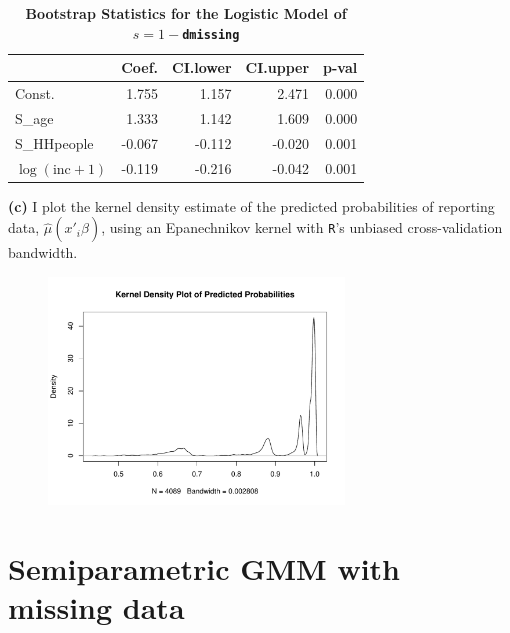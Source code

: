 \documentclass[12pt]{article}
\newcommand{\mtx}[1]{\ensuremath{\bm{\mathit{#1}}}}
\begin{document}
\begin{table}[!htpb]
\centering
\caption{\textbf{Bootstrap Statistics for the Logistic Model of $s=1-$\texttt{dmissing}}}
\begin{tabular}{lrrrr}
  \hline
 & Coef. & CI.lower & CI.upper & p-val \\ 
  \hline
Const. & 1.755 & 1.157 & 2.471 & 0.000 \\ 
  S\_age & 1.333 & 1.142 & 1.609 & 0.000 \\ 
  S\_HHpeople & -0.067 & -0.112 & -0.020 & 0.001 \\ 
  $\log(\text{inc}+1)$  & -0.119 & -0.216 & -0.042 & 0.001 \\ 
   \hline
\end{tabular}
\end{table}

\textbf{(c)} I plot the kernel density estimate of the predicted probabilities of reporting data, $\hat{\mu}(\mtx{x}'_i\hat{\mtx{\beta}})$, using an Epanechnikov kernel with \verb|R|'s unbiased cross-validation bandwidth.

\begin{figure}[!htpb]
    \centering
    
        \includegraphics[width=0.7\textwidth]{kdens.pdf}

\end{figure}

\newpage


\section{Semiparametric GMM with missing data}
\end{document}
